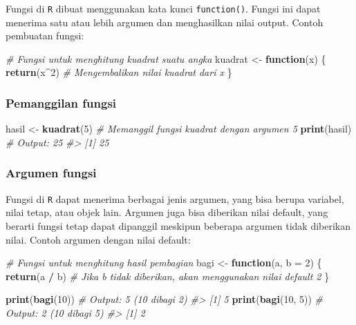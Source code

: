 \documentclass[
  oneside]{book}
\newenvironment{Shaded}{\begin{snugshade}}{\end{snugshade}}
\newcommand{\AttributeTok}[1]{\textcolor[rgb]{0.13,0.29,0.53}{#1}}
\newcommand{\CommentTok}[1]{\textcolor[rgb]{0.56,0.35,0.01}{\textit{#1}}}
\newcommand{\ControlFlowTok}[1]{\textcolor[rgb]{0.13,0.29,0.53}{\textbf{#1}}}
\newcommand{\DecValTok}[1]{\textcolor[rgb]{0.00,0.00,0.81}{#1}}
\newcommand{\FunctionTok}[1]{\textcolor[rgb]{0.13,0.29,0.53}{\textbf{#1}}}
\newcommand{\NormalTok}[1]{#1}
\newcommand{\OtherTok}[1]{\textcolor[rgb]{0.56,0.35,0.01}{#1}}
\newcommand{\SpecialCharTok}[1]{\textcolor[rgb]{0.81,0.36,0.00}{\textbf{#1}}}
\begin{document}
Fungsi di \texttt{R} dibuat menggunakan kata kunci \texttt{function()}.
Fungsi ini dapat menerima satu atau lebih argumen dan menghasilkan nilai
output. Contoh pembuatan fungsi:

\begin{Shaded}
\begin{Highlighting}[]
\CommentTok{\# Fungsi untuk menghitung kuadrat suatu angka}
\NormalTok{kuadrat }\OtherTok{\textless{}{-}} \ControlFlowTok{function}\NormalTok{(x) \{}
  \FunctionTok{return}\NormalTok{(x}\SpecialCharTok{\^{}}\DecValTok{2}\NormalTok{)   }\CommentTok{\# Mengembalikan nilai kuadrat dari x}
\NormalTok{\}}
\end{Highlighting}
\end{Shaded}

\subsubsection*{Pemanggilan fungsi}\label{pemanggilan-fungsi}

\begin{Shaded}
\begin{Highlighting}[]
\NormalTok{hasil }\OtherTok{\textless{}{-}} \FunctionTok{kuadrat}\NormalTok{(}\DecValTok{5}\NormalTok{)  }\CommentTok{\# Memanggil fungsi \textquotesingle{}kuadrat\textquotesingle{} dengan argumen 5}
\FunctionTok{print}\NormalTok{(hasil)          }\CommentTok{\# Output: 25}
\CommentTok{\#\textgreater{} [1] 25}
\end{Highlighting}
\end{Shaded}

\subsubsection*{Argumen fungsi}\label{argumen-fungsi}

Fungsi di \texttt{R} dapat menerima berbagai jenis argumen, yang
bisa berupa variabel, nilai tetap, atau objek lain. Argumen juga bisa
diberikan nilai default, yang berarti fungsi tetap dapat dipanggil
meskipun beberapa argumen tidak diberikan nilai. Contoh argumen dengan
nilai default:

\begin{Shaded}
\begin{Highlighting}[]
\CommentTok{\# Fungsi untuk menghitung hasil pembagian}
\NormalTok{bagi }\OtherTok{\textless{}{-}} \ControlFlowTok{function}\NormalTok{(a, }\AttributeTok{b =} \DecValTok{2}\NormalTok{) \{}
  \FunctionTok{return}\NormalTok{(a }\SpecialCharTok{/}\NormalTok{ b)  }\CommentTok{\# Jika b tidak diberikan, akan menggunakan nilai default 2}
\NormalTok{\}}

\FunctionTok{print}\NormalTok{(}\FunctionTok{bagi}\NormalTok{(}\DecValTok{10}\NormalTok{))   }\CommentTok{\# Output: 5 (10 dibagi 2)}
\CommentTok{\#\textgreater{} [1] 5}
\FunctionTok{print}\NormalTok{(}\FunctionTok{bagi}\NormalTok{(}\DecValTok{10}\NormalTok{, }\DecValTok{5}\NormalTok{)) }\CommentTok{\# Output: 2 (10 dibagi 5)}
\CommentTok{\#\textgreater{} [1] 2}
\end{Highlighting}
\end{Shaded}
\end{document}
